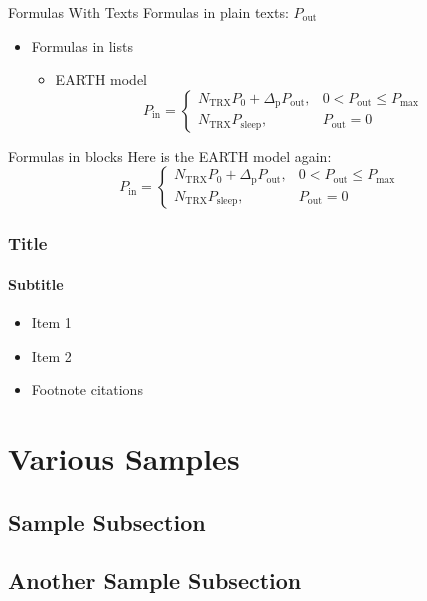 \documentclass[onlycurpagenum,infolines]{beamer}
\begin{document}
\begin{frame}{Formulas With Texts}
  Formulas in plain texts: {\rmfamily $P_\text{out}$}
  \begin{itemize}
    \item Formulas in lists
      \begin{itemize}
        \item EARTH model
\begin{equation}
  P_\text{in} = \begin{cases}
    N_{\text{TRX}} P_0 + \Delta_\text{p} P_\text{out}, & 0 < P_\text{out} \le P_\text{max} \\
    N_{\text{TRX}} P_\text{sleep}, & P_\text{out} = 0
  \end{cases}
\end{equation}
      \end{itemize}
  \end{itemize}
  \begin{exampleblock}{Formulas in blocks}
    Here is the EARTH model again:\rmfamily
\begin{equation}
  P_\text{in} = \begin{cases}
    N_{\text{TRX}} P_0 + \Delta_\text{p} P_\text{out}, & 0 < P_\text{out} \le P_\text{max} \\
    N_{\text{TRX}} P_\text{sleep}, & P_\text{out} = 0
  \end{cases}
\end{equation}
  \end{exampleblock}
\end{frame}

\begin{frame}
  \frametitle{Title}
  \framesubtitle{Subtitle}
  \begin{itemize}
    \item Item 1
    \item Item 2
    \item Footnote citations~
  \end{itemize}
\end{frame}

\section{Various Samples}
\subsection{Sample Subsection}
\subsection{Another Sample Subsection}
\end{document}

